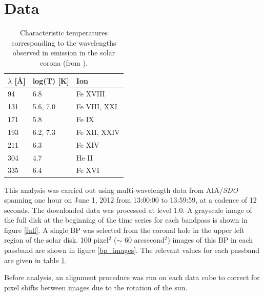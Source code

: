 \documentclass[preprint2]{aastex}
\begin{document}
\section{Data}\label{data}
\begin{table}[h]
\centering
    \begin{tabular}{l l l}
        \hline\hline
        $\lambda$ [\AA{}] & log(T) [K] & Ion \\
        \hline
        94 & 6.8 & Fe {\small XVIII} \\
        131 & 5.6, 7.0 & Fe {\small VIII, XXI} \\
        171 & 5.8 & Fe {\small IX} \\
        193 & 6.2, 7.3 & Fe {\small XII, XXIV} \\
        211 & 6.3 & Fe {\small XIV} \\
        304 & 4.7 & He {\small II} \\
        335 & 6.4 & Fe {\small XVI} \\
    \end{tabular}
\caption{Characteristic temperatures corresponding to the wavelengths observed
    in emission in the solar corona (from \cite{Lemen}).}
\label{temps}
\end{table}

This analysis was carried out using multi-wavelength data from AIA/\textit{SDO}
spanning one hour on June 1, 2012 from 13:00:00 to 13:59:59, at a cadence of 12
seconds.
The downloaded data was processed at level 1.0.
A grayscale image of the full disk at the beginning of the time series for each
bandpass is shown in figure \ref{full}.
A single BP was selected from the coronal hole in the upper
left region of the solar disk.
100 pixel$^{2}$ ($\sim$ 60 arcsecond$^{2}$)
images of this BP in each passband are shown in figure \ref{bp_images}.
The relevant values for each passband are given in table \ref{temps}.

Before analysis,
an alignment procedure was run on each data cube to correct for pixel shifts between
images due to the rotation of the sun.
\end{document}
